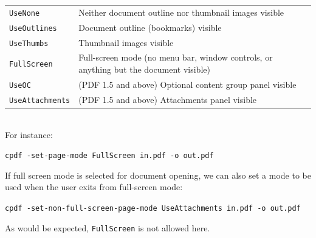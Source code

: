 \documentclass{book}
\begin{document}
\vspace{2mm}
  {\small\begin{tabular}{ll}
    \texttt{UseNone} & \vspace{2mm} \parbox{8cm}{Neither document outline nor thumbnail images visible} \\
    \texttt{UseOutlines} & \vspace{2mm} \parbox{8cm}{Document outline (bookmarks) visible} \\
    \texttt{UseThumbs} & \vspace{2mm} \parbox{8cm}{Thumbnail images visible} \\
    \texttt{FullScreen} & \vspace{2mm} \parbox{8cm}{Full-screen mode (no menu bar, window controls, or anything but the document visible)} \\
    \texttt{UseOC} & \vspace{2mm} \parbox{8cm}{(PDF 1.5 and above) Optional content group panel visible} \\
    \texttt{UseAttachments} & \vspace{2mm} \parbox{8cm}{(PDF 1.5 and above) Attachments panel visible}
  \end{tabular}}\\

  \noindent For instance:
  \begin{framed}
    \noindent\small\verb!cpdf -set-page-mode FullScreen in.pdf -o out.pdf!
  \end{framed}
  
  \noindent If full screen mode is selected for document opening, we can also set a mode to be used when the user exits from full-screen mode:
  \begin{framed}
    \noindent\small\verb!cpdf -set-non-full-screen-page-mode UseAttachments in.pdf -o out.pdf!
  \end{framed}

  \noindent As would be expected, \texttt{FullScreen} is not allowed here.
  
\end{document}
